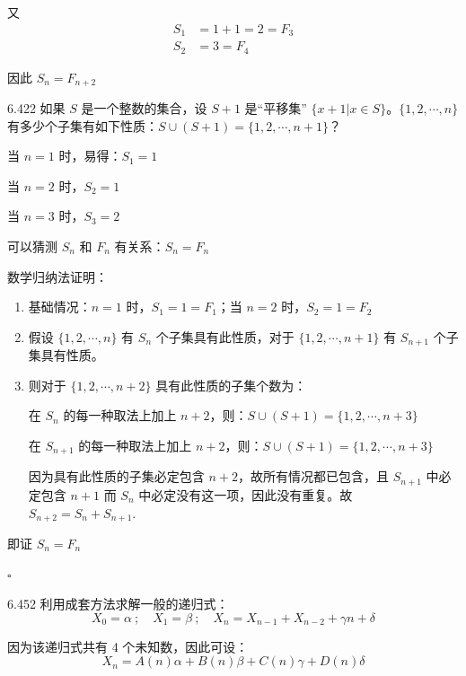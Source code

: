 又
\begin{align*}
  S_1 &= 1 + 1 = 2 = F_3 \\
  S_2 &= 3 = F_4
\end{align*}

因此 \( S_n = F_{n+2} \)

\begin{problem}{6.42}{2}
  如果 \( S \) 是一个整数的集合，设 \( S + 1 \) 是“平移集” \( \{ x+1 | x \in S \} \)。\( \{ 1, 2, \cdots, n \} \) 有多少个子集有如下性质：\( S \cup (S+1) = \{ 1, 2, \cdots, n+1 \} \)？
\end{problem}

当 \( n = 1 \) 时，易得：\( S_1 = 1 \)

当 \( n = 2 \) 时，\( S_2 = 1 \)

当 \( n = 3 \) 时，\( S_3 = 2 \)

可以猜测 \( S_n \) 和 \( F_n \) 有关系：\( S_n = F_n \)

数学归纳法证明：
\begin{enumerate}
  \item[1.] 基础情况：\( n = 1 \) 时，\( S_1 = 1 = F_1 \)；当 \( n = 2 \) 时，\( S_2 = 1 = F_2 \)
  \item[2.] 假设 \( \{ 1, 2, \cdots, n \} \) 有 \( S_n \) 个子集具有此性质，对于 \( \{ 1, 2, \cdots, n+1 \} \) 有 \( S_{n+1} \) 个子集具有性质。
  \item[3.] 则对于 \( \{ 1, 2, \cdots, n+2 \} \) 具有此性质的子集个数为：

    在 \( S_n \) 的每一种取法上加上 \( n+2 \)，则：\( S \cup (S+1) = \{ 1, 2, \cdots, n+3 \} \)

    在 \( S_{n+1} \) 的每一种取法上加上 \( n+2 \)，则：\( S \cup (S+1) = \{ 1, 2, \cdots, n+3 \} \)

    因为具有此性质的子集必定包含 \( n+2 \)，故所有情况都已包含，且 \( S_{n+1} \) 中必定包含 \( n+1 \) 而 \( S_n \) 中必定没有这一项，因此没有重复。故 \( S_{n+2} = S_n + S_{n+1} \).
\end{enumerate}

即证 \( S_n = F_n \)

\hfill \( \square \)

\begin{problem}{6.45}{2}
  利用成套方法求解一般的递归式：
  \[
    X_0 = \alpha \ ; \quad X_1 = \beta \ ; \quad X_n = X_{n-1} + X_{n-2} + \gamma n + \delta
  \]
\end{problem}

因为该递归式共有 4 个未知数，因此可设：
\[
  X_n = A(n) \alpha + B(n) \beta + C(n) \gamma + D(n) \delta
\]

